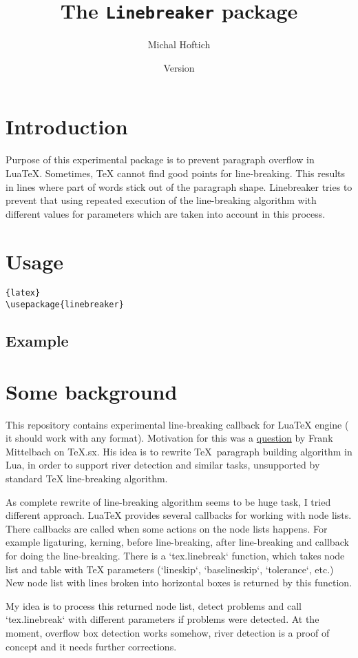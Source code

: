 \documentclass{ltxdoc}
\title{The \texttt{Linebreaker} package}
\author{Michal Hoftich\authormail{michal.h21@gmail.com}}
\date{Version \version\\\gitdate}
\begin{document}
\maketitle
\tableofcontents

\section{Introduction}

Purpose of this experimental package is to prevent paragraph overflow in
LuaTeX. Sometimes, TeX cannot find good points for line-breaking. This results
in lines where part of words stick out of the paragraph shape. Linebreaker
tries to prevent that using repeated execution of the line-breaking algorithm
with different values for parameters which are taken into account in this
process.


\section{Usage}


\begin{lstlisting}{latex}
\usepackage{linebreaker}
\end{lstlisting}


\subsection{Example}


\section{Some background}

This repository contains experimental line-breaking callback for LuaTeX engine (
it should work with any format). Motivation for this was a
\href{http://tex.stackexchange.com/q/200989/2891}{question} by Frank Mittelbach on
TeX.sx. His idea is to rewrite \TeX\ paragraph building algorithm in Lua, in
order to support river detection and similar tasks, unsupported by standard TeX
line-breaking algorithm.

As complete rewrite of line-breaking algorithm seems to be huge task, I tried
different approach. LuaTeX provides several callbacks for working with node lists. 
There callbacks are called when some actions on the node lists happens. For
example ligaturing, kerning, before line-breaking, after line-breaking and
callback for doing the line-breaking. There is a `tex.linebreak` function, which takes
node list and table with TeX parameters (`lineskip`, `baselineskip`, `tolerance`,
etc.) New node list with lines broken into horizontal boxes is returned by this
function.

My idea is to process this returned node list, detect problems and call
`tex.linebreak` with different parameters if problems were detected. At the
moment, overflow box detection works somehow, river detection is a proof of
concept and it needs further corrections.
\end{document}
